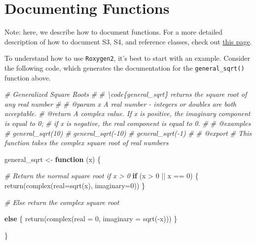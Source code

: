 \documentclass[
]{book}
\newenvironment{Shaded}{\begin{snugshade}}{\end{snugshade}}
\newcommand{\AttributeTok}[1]{\textcolor[rgb]{0.77,0.63,0.00}{#1}}
\newcommand{\CommentTok}[1]{\textcolor[rgb]{0.56,0.35,0.01}{\textit{#1}}}
\newcommand{\ControlFlowTok}[1]{\textcolor[rgb]{0.13,0.29,0.53}{\textbf{#1}}}
\newcommand{\DecValTok}[1]{\textcolor[rgb]{0.00,0.00,0.81}{#1}}
\newcommand{\FunctionTok}[1]{\textcolor[rgb]{0.00,0.00,0.00}{#1}}
\newcommand{\NormalTok}[1]{#1}
\newcommand{\OtherTok}[1]{\textcolor[rgb]{0.56,0.35,0.01}{#1}}
\newcommand{\SpecialCharTok}[1]{\textcolor[rgb]{0.00,0.00,0.00}{#1}}
\begin{document}
\hypertarget{documenting-functions}{%
\section{Documenting Functions}\label{documenting-functions}}

Note: here, we describe how to document functions. For a more detailed description of how to document S3, S4, and reference classes, check out \href{http://r-pkgs.had.co.nz/man.html}{this page}.

To understand how to use \texttt{Roxygen2}, it's best to start with an example. Consider the following code, which generates the documentation for the \texttt{general\_sqrt()} function above.

\begin{Shaded}
\begin{Highlighting}[]
\CommentTok{\#\textquotesingle{} Generalized Square Roots}
\CommentTok{\#\textquotesingle{}}
\CommentTok{\#\textquotesingle{} \textbackslash{}code\{general\_sqrt\} returns the square root of any real number}
\CommentTok{\#\textquotesingle{}}
\CommentTok{\#\textquotesingle{} @param x A real number {-} integers or doubles are both acceptable.}
\CommentTok{\#\textquotesingle{} @return A complex value. If x is positive, the imaginary component is equal to 0;}
\CommentTok{\#\textquotesingle{} if x is negative, the real component is equal to 0.}
\CommentTok{\#\textquotesingle{}}
\CommentTok{\#\textquotesingle{} @examples}
\CommentTok{\#\textquotesingle{} general\_sqrt(10)}
\CommentTok{\#\textquotesingle{} general\_sqrt({-}10)}
\CommentTok{\#\textquotesingle{} general\_sqrt({-}1)}
\CommentTok{\#\textquotesingle{}}
\CommentTok{\#\textquotesingle{} @export}
\CommentTok{\# This function takes the complex square root of real numbers}

\NormalTok{general\_sqrt }\OtherTok{\textless{}{-}} \ControlFlowTok{function}\NormalTok{ (x) \{}

  \CommentTok{\# Return the normal square root if x \textgreater{} 0}
  \ControlFlowTok{if}\NormalTok{ (x }\SpecialCharTok{\textgreater{}} \DecValTok{0} \SpecialCharTok{||}\NormalTok{ x }\SpecialCharTok{==} \DecValTok{0}\NormalTok{) \{}
    \FunctionTok{return}\NormalTok{(}\FunctionTok{complex}\NormalTok{(}\AttributeTok{real=}\FunctionTok{sqrt}\NormalTok{(x), }\AttributeTok{imaginary=}\DecValTok{0}\NormalTok{))}
\NormalTok{  \}}

  \CommentTok{\# Else return the complex square root}

  \ControlFlowTok{else}\NormalTok{ \{}
    \FunctionTok{return}\NormalTok{(}\FunctionTok{complex}\NormalTok{(}\AttributeTok{real =} \DecValTok{0}\NormalTok{, }\AttributeTok{imaginary =} \FunctionTok{sqrt}\NormalTok{(}\SpecialCharTok{{-}}\NormalTok{x)))}
\NormalTok{  \}}

\NormalTok{\}}
\end{Highlighting}
\end{Shaded}
\end{document}
